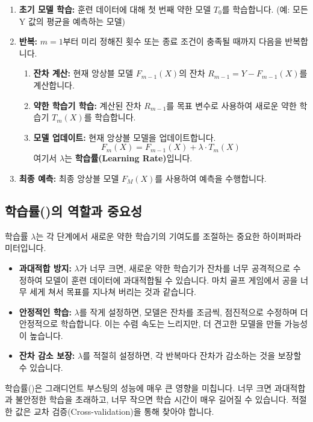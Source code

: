 \documentclass[11pt,a4paper]{book}
\theoremstyle{definition}
\begin{document}
\begin{enumerate}
    \item \textbf{초기 모델 학습:} 훈련 데이터에 대해 첫 번째 약한 모델 $T_0$를 학습합니다. (예: 모든 Y 값의 평균을 예측하는 모델)
    \item \textbf{반복:} $m=1$부터 미리 정해진 횟수 또는 종료 조건이 충족될 때까지 다음을 반복합니다.
    \begin{enumerate}
        \item \textbf{잔차 계산:} 현재 앙상블 모델 $F_{m-1}(X)$의 잔차 $R_{m-1} = Y - F_{m-1}(X)$를 계산합니다.
        \item \textbf{약한 학습기 학습:} 계산된 잔차 $R_{m-1}$를 목표 변수로 사용하여 새로운 약한 학습기 $T_m(X)$를 학습합니다.
        \item \textbf{모델 업데이트:} 현재 앙상블 모델을 업데이트합니다.
        \[ F_m(X) = F_{m-1}(X) + \lambda \cdot T_m(X) \]
        여기서 $\lambda$는 \textbf{학습률(Learning Rate)}입니다.
    \end{enumerate}
    \item \textbf{최종 예측:} 최종 앙상블 모델 $F_M(X)$를 사용하여 예측을 수행합니다.
\end{enumerate}

\subsection{학습률(\texttt{\lambda})의 역할과 중요성}
학습률 $\lambda$는 각 단계에서 새로운 약한 학습기의 기여도를 조절하는 중요한 하이퍼파라미터입니다.

\begin{itemize}
    \item \textbf{과대적합 방지:} $\lambda$가 너무 크면, 새로운 약한 학습기가 잔차를 너무 공격적으로 수정하여 모델이 훈련 데이터에 과대적합될 수 있습니다. 마치 골프 게임에서 공을 너무 세게 쳐서 목표를 지나쳐 버리는 것과 같습니다.
    \item \textbf{안정적인 학습:} $\lambda$를 작게 설정하면, 모델은 잔차를 조금씩, 점진적으로 수정하며 더 안정적으로 학습합니다. 이는 수렴 속도는 느리지만, 더 견고한 모델을 만들 가능성이 높습니다.
    \item \textbf{잔차 감소 보장:} $\lambda$를 적절히 설정하면, 각 반복마다 잔차가 감소하는 것을 보장할 수 있습니다.
\end{itemize}

\begin{tcolorbox}[importantbox, title={학습률(\texttt{\lambda})의 중요성}] %
학습률(\texttt{\lambda})은 그래디언트 부스팅의 성능에 매우 큰 영향을 미칩니다. 너무 크면 과대적합과 불안정한 학습을 초래하고, 너무 작으면 학습 시간이 매우 길어질 수 있습니다. 적절한 \texttt{\lambda} 값은 교차 검증(Cross-validation)을 통해 찾아야 합니다.
\end{tcolorbox}
\end{document}

